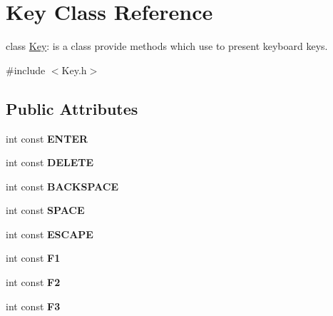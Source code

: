 \hypertarget{class_key}{
\section{Key Class Reference}
\label{class_key}
}


class \hyperlink{class_key}{Key}: is a class provide methods which use to present keyboard keys.  




{\ttfamily \#include $<$Key.h$>$}

\subsection*{Public Attributes}
\begin{DoxyCompactItemize}
\item 
\hypertarget{group__group12_ga73ef895ad1251d30ad8b0c0d6c01086f}{
int const {\bfseries ENTER}}
\label{group__group12_ga73ef895ad1251d30ad8b0c0d6c01086f}

\item 
\hypertarget{group__group12_ga0dd26c431063ec9e8881b4736f2c7ffc}{
int const {\bfseries DELETE}}
\label{group__group12_ga0dd26c431063ec9e8881b4736f2c7ffc}

\item 
\hypertarget{group__group12_ga3834825cc0fa063951006874aee9e1f8}{
int const {\bfseries BACKSPACE}}
\label{group__group12_ga3834825cc0fa063951006874aee9e1f8}

\item 
\hypertarget{group__group12_gadc68fc137cbec5d1767f6814ffbdf6bc}{
int const {\bfseries SPACE}}
\label{group__group12_gadc68fc137cbec5d1767f6814ffbdf6bc}

\item 
\hypertarget{group__group12_gac9056251860c0e730f4383ce98fafd16}{
int const {\bfseries ESCAPE}}
\label{group__group12_gac9056251860c0e730f4383ce98fafd16}

\item 
\hypertarget{group__group12_gaab372a1a57f11005b3a00ca48655d777}{
int const {\bfseries F1}}
\label{group__group12_gaab372a1a57f11005b3a00ca48655d777}

\item 
\hypertarget{group__group12_ga287e06084e2d49c8c7a3aa38e07792e7}{
int const {\bfseries F2}}
\label{group__group12_ga287e06084e2d49c8c7a3aa38e07792e7}

\item 
\hypertarget{group__group12_gaa9e73a0e8bddf042df5423f11963632d}{
int const {\bfseries F3}}
\label{group__group12_gaa9e73a0e8bddf042df5423f11963632d}


\end{DoxyCompactItemize}

